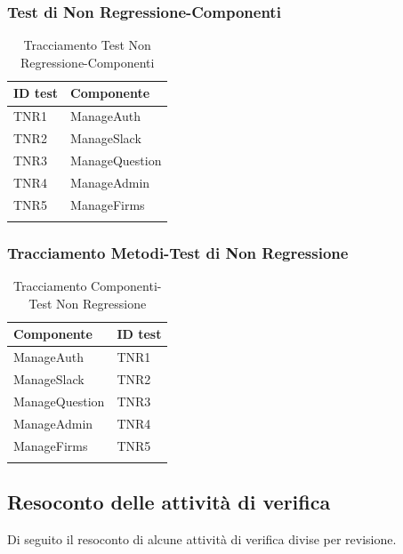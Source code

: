 \documentclass[../PianoDiQualifica_v4.0.0.tex]{subfiles}
\begin{document}
	\subsubsection{Test di Non Regressione-Componenti}
	\begin{longtable}[c] {>{\centering\arraybackslash}p{4cm} >{\centering\arraybackslash}p{4cm}}
		\toprule
		\centerline{\textbf{ID test}} & \centerline{\textbf{Componente}} \\
			\midrule
			TNR1 & ManageAuth \\
			\addlinespace[0.3em]
			\midrule
			\addlinespace[0.3em]
			TNR2 & ManageSlack \\
			\addlinespace[0.3em]
			\midrule
			\addlinespace[0.3em]
			TNR3 & ManageQuestion \\
			\addlinespace[0.3em]
			\midrule
			\addlinespace[0.3em]
			TNR4 & ManageAdmin \\
			\addlinespace[0.3em]
			\midrule
			\addlinespace[0.3em]
			TNR5 & ManageFirms \\
			\bottomrule
			\caption{Tracciamento Test Non Regressione-Componenti}
	\end{longtable}

	\subsubsection{Tracciamento Metodi-Test di Non Regressione}
	\begin{longtable}[c] {>{\centering\arraybackslash}p{4cm} >{\centering\arraybackslash}p{4cm}}
		\toprule
		\centerline{\textbf{Componente}} & \centerline{\textbf{ID test}} \\
			\midrule
			 ManageAuth & TNR1 \\
			\addlinespace[0.3em]
			\midrule
			\addlinespace[0.3em]
			ManageSlack & TNR2 \\
			\addlinespace[0.3em]
			\midrule
			\addlinespace[0.3em]
			ManageQuestion & TNR3 \\
			\addlinespace[0.3em]
			\midrule
			\addlinespace[0.3em]
			ManageAdmin & TNR4 \\
			\addlinespace[0.3em]
			\midrule
			\addlinespace[0.3em]
			ManageFirms & TNR5 \\
			\bottomrule
			\caption{Tracciamento Componenti-Test Non Regressione}
	\end{longtable}

\newpage
	\subsection{Resoconto delle attività di verifica}
		Di seguito il resoconto di alcune attività di verifica divise per revisione.
\end{document}
